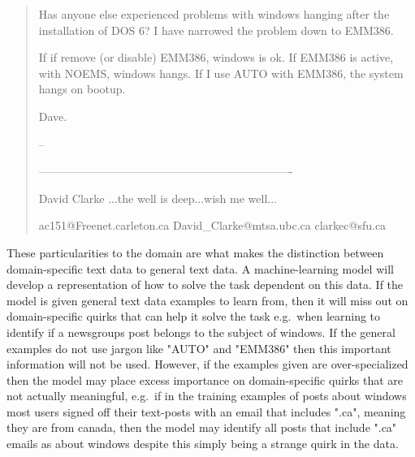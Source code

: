 \begin{quote}
	Has anyone else experienced problems with windows hanging
	after the installation of DOS 6?  I have narrowed the
	problem down to EMM386.
	
	If if remove (or disable) EMM386, windows is ok.  If EMM386
	is active, with NOEMS, windows hangs.  If I use AUTO with
	EMM386, the system hangs on bootup.
	
	Dave.
	
	
	-- 
	
	-------------------------------------------------------------------
	
	David Clarke   ...the well is deep...wish me well...
	
	ac151@Freenet.carleton.ca  David\_Clarke@mtsa.ubc.ca  clarkec@sfu.ca
\end{quote}

These particularities to the domain are what makes the distinction between domain-specific text data to general text data. A machine-learning model will develop a representation of how to solve the task dependent on this data. If the model is given general text data examples to learn from, then it will miss out on domain-specific quirks that can help it solve the task e.g.\ when learning to identify if a newsgroups post belongs to the subject of windows. If the general examples do not use jargon like "AUTO" and "EMM386" then this important information will not be used. However, if the examples given are over-specialized then the model may place excess importance on domain-specific quirks that are not actually meaningful, e.g.\ if in the training examples of posts about windows most users signed off their text-posts with an email that includes ".ca", meaning they are from canada, then the model may identify all posts that include ".ca" emails as about windows despite this simply being a strange quirk in the data.


